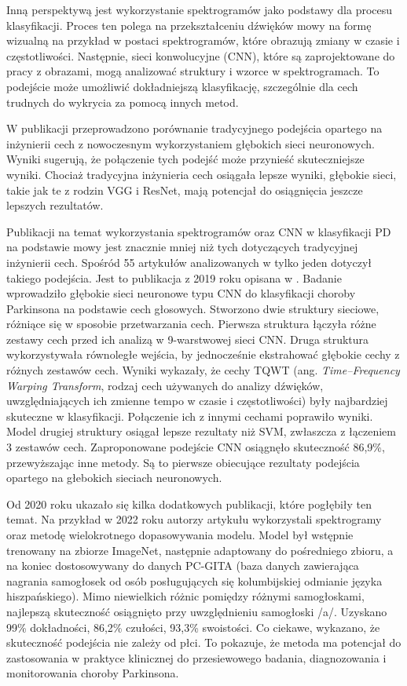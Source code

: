 Inną perspektywą jest wykorzystanie spektrogramów jako podstawy dla procesu klasyfikacji.
Proces ten polega na przekształceniu dźwięków mowy na formę wizualną na przykład w postaci spektrogramów, które obrazują zmiany w czasie i częstotliwości.
Następnie, sieci konwolucyjne (CNN), które są zaprojektowane do pracy z obrazami, mogą analizować struktury i wzorce w spektrogramach.
To podejście może umożliwić dokładniejszą klasyfikację, szczególnie dla cech trudnych do wykrycia za pomocą innych metod.

W publikacji \cite{Majda-Zdancewicz_Potulska-Chromik_Jakubowski_Nojszewska_Kostera-Pruszczyk} przeprowadzono porównanie tradycyjnego podejścia
opartego na inżynierii cech z nowoczesnym wykorzystaniem głębokich sieci neuronowych.
Wyniki sugerują, że połączenie tych podejść może przynieść skuteczniejsze wyniki.
Chociaż tradycyjna inżynieria cech osiągała lepsze wyniki, głębokie sieci, takie jak te z rodzin VGG i ResNet, mają potencjał do osiągnięcia jeszcze
lepszych rezultatów.

Publikacji na temat wykorzystania spektrogramów oraz CNN w klasyfikacji PD na podstawie mowy jest znacznie mniej niż tych dotyczących tradycyjnej inżynierii cech.
Spośród 55 artykułów analizowanych w \cite{ML_for_PD_review} tylko jeden dotyczył takiego podejścia.
Jest to publikacja z 2019 roku opisana w \cite{Gunduz}.
Badanie wprowadziło głębokie sieci neuronowe typu CNN do klasyfikacji choroby Parkinsona na podstawie cech głosowych.
Stworzono dwie struktury sieciowe, różniące się w sposobie przetwarzania cech.
Pierwsza struktura łączyła różne zestawy cech przed ich analizą w 9-warstwowej sieci CNN. Druga struktura wykorzystywała
równoległe wejścia, by jednocześnie ekstrahować głębokie cechy z różnych zestawów cech.
Wyniki wykazały, że cechy TQWT (ang. \emph{Time–Frequency Warping Transform}, rodzaj cech używanych do analizy dźwięków,
uwzględniających ich zmienne tempo w czasie i częstotliwości) były najbardziej skuteczne w klasyfikacji.
Połączenie ich z innymi cechami poprawiło wyniki.
Model drugiej struktury osiągał lepsze rezultaty niż SVM, zwłaszcza z łączeniem 3 zestawów cech.
Zaproponowane podejście CNN osiągnęło skuteczność 86,9\%, przewyższając inne metody.
Są to pierwsze obiecujące rezultaty podejścia opartego na głebokich sieciach neuronowych.

Od 2020 roku ukazało się kilka dodatkowych publikacji, które pogłębiły ten temat.
Na przykład w 2022 roku autorzy artykułu \cite{HIRES2022105021} wykorzystali spektrogramy oraz metodę wielokrotnego dopasowywania modelu.
Model był wstępnie trenowany na zbiorze ImageNet, następnie adaptowany do pośredniego zbioru, a na koniec dostosowywany do danych PC-GITA (baza danych zawierająca nagrania samogłosek od
osób posługujących się kolumbijskiej odmianie języka hiszpańskiego).
Mimo niewielkich różnic pomiędzy różnymi samogłoskami, najlepszą skuteczność osiągnięto przy uwzględnieniu samogłoski /a/.
Uzyskano 99\% dokładności, 86,2\% czułości, 93,3\% swoistości.
Co ciekawe, wykazano, że skuteczność podejścia nie zależy od płci.
To pokazuje, że metoda ma potencjał do zastosowania w praktyce klinicznej do przesiewowego badania, diagnozowania i monitorowania choroby Parkinsona.


